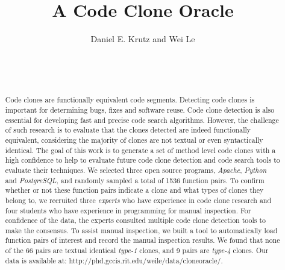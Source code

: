 \documentclass{sig-alternate}
\newcommand{\todo}[1]{\textcolor{cyan}{\textbf{[#1]}}}
\begin{document}

\title{A Code Clone Oracle}

\author{
%
%
\alignauthor
Daniel E. Krutz and Wei Le\\ 	
       \\
        \\
        \\
}


\maketitle
\begin{abstract}

Code clones are functionally equivalent code segments. Detecting code clones is important for determining bugs, fixes and software reuse. Code clone detection is also essential for developing fast and precise code search algorithms. However, the challenge of such research is to evaluate that the clones detected are indeed functionally equivalent, considering the majority of clones are not textual or even syntactically identical. The goal of this work is to generate a set of method level code clones with a high confidence to help to evaluate future code clone detection and code search tools to evaluate their techniques. We selected three open source programs, {\it Apache}, {\it Python} and {\it PostgreSQL}, and randomly sampled a total of 1536 function pairs. To confirm whether or not these function pairs indicate a clone and what types of clones they belong to,  we recruited three {\it experts} who have experience in code clone research and four students who have experience in programming for manual inspection. For confidence of the data, the experts consulted multiple code clone detection tools to make the consensus. To assist manual inspection, we built a tool to automatically load function pairs of interest and record the manual inspection results. We found that none of the 66 pairs are textual identical  {\it type-1} clones, and 9 pairs are {\it type-4} clones. Our data is available at: http://phd.gccis.rit.edu/weile/data/cloneoracle/.

\end{abstract}


\end{document}
